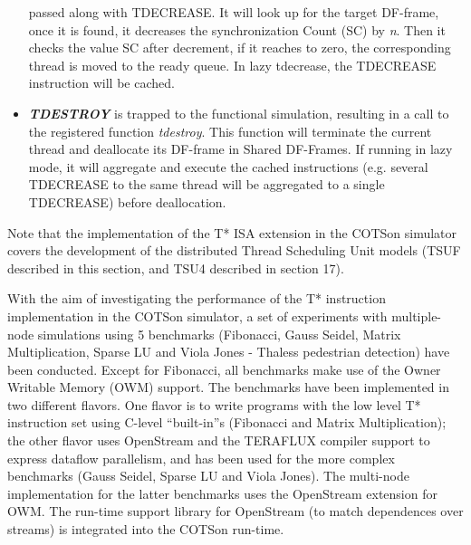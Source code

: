 \documentclass[a4paper]{article}
\begin{document}
\begin{itemize}
{passed along with TDECREASE. It will look up for the target DF-frame,
once it is found, it decreases the synchronization Count (SC) by
\textit{n}. Then it checks the value SC after decrement, if it reaches
to zero, the corresponding thread is moved to the ready queue. In lazy
tdecrease, the TDECREASE instruction will be cached.}
\item {
\textbf{\textit{TDESTROY}} is trapped to the functional simulation,
resulting in a call to the registered function \textit{tdestroy}. This
function will terminate the current thread and deallocate its DF-frame
in Shared DF-Frames. If running in lazy mode, it will aggregate and
execute the cached instructions (e.g. several TDECREASE to the same
thread will be aggregated to a single TDECREASE) before deallocation.}
\end{itemize}
{
Note that the implementation of the T* ISA extension in the COTSon
simulator covers the development of the distributed Thread Scheduling
Unit models (TSUF described in this section, and TSU4 described in
section 17).}

{
With the aim of investigating the performance of the T* instruction
implementation in the COTSon simulator, a set of experiments with
multiple-node simulations using 5 benchmarks (Fibonacci, Gauss Seidel,
Matrix Multiplication, Sparse LU and Viola Jones -
Thales{\textquotesingle}s pedestrian detection) have been conducted.
Except for Fibonacci, all benchmarks make use of the Owner Writable
Memory (OWM) support. The benchmarks have been implemented in two
different flavors. One flavor is to write programs with the low level
T* instruction set using C-level
{\textquotedblleft}built-in{\textquotedblright}s (Fibonacci and Matrix
Multiplication); the other flavor uses OpenStream and the TERAFLUX
compiler support to express dataflow parallelism, and has been used for
the more complex benchmarks (Gauss Seidel, Sparse LU and Viola Jones).
The multi-node implementation for the latter benchmarks uses the
OpenStream extension for OWM. The run-time support library for
OpenStream (to match dependences over streams) is integrated into the
COTSon run-time. }
\end{document}
